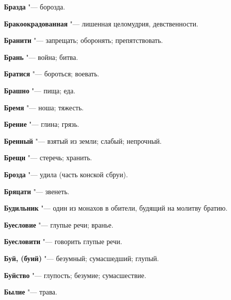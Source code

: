\begin{mymulticols}{2}
\noindent\textbf{Бразда} "--- борозда. 




\noindent\textbf{Бракоокрадованная} "--- лишенная целомудрия, девственности. 




\noindent\textbf{Бранити} "--- запрещать; оборонять; препятствовать. 




\noindent\textbf{Брань} "--- война; битва. 




\noindent\textbf{Братися} "--- бороться; воевать. 




\noindent\textbf{Брашно} "--- пища; еда. 




\noindent\textbf{Бремя} "--- ноша; тяжесть. 




\noindent\textbf{Брение} "--- глина; грязь. 




\noindent\textbf{Бренный} "--- взятый из земли; слабый; непрочный. 




\noindent\textbf{Брещи} "--- стеречь; хранить. 




\noindent\textbf{Брозда} "--- удила (часть конской сбруи). 




\noindent\textbf{Бряцати} "--- звенеть. 




\noindent\textbf{Будильник} "--- один из монахов в обители, будящий на молитву братию. 




\noindent\textbf{Буесловие} "--- глупые речи; вранье. 




\noindent\textbf{Буесловити} "--- говорить глупые речи. 




\noindent\textbf{Буй, (буий)} "--- безумный; сумасшедший; глупый. 




\noindent\textbf{Буйство} "--- глупость; безумие; сумасшествие. 




\noindent\textbf{Былие} "--- трава. 










\end{mymulticols}

